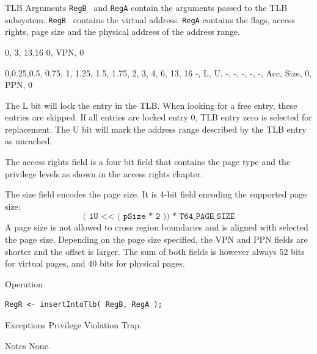 \begin{iPageDescEntry}{TLB Arguments}
	\texttt{RegB}  and \texttt{RegA} contain the arguments passed to the TLB subsystem. \texttt{RegB}  contains the virtual address. \texttt{RegA} contains the flags, access rights, page size and the physical address of the address range. 
	
	\begin{flushleft}
	\drawInstrFormatSixtyFour
        {0, 3, 13,16}
        {0, VPN, 0}
    \end{flushleft}
    \begin{flushleft}
	\drawInstrFormatSixtyFour
        {0,0.25,0.5, 0.75, 1, 1.25, 1.5, 1.75, 2, 3, 4, 6, 13, 16}
        {-, L, U, -, -, -, -, -, Acc, Size, 0, PPN, 0}
    \end{flushleft}
    
    The L bit will lock the entry in the TLB. When looking for a free entry, these entries are skipped. If all entries are locked entry 0, TLB entry zero is selected for replacement. The U bit will mark the address range described by the TLB entry as uncached.
    
    The access rights field is a four bit field that contains the page type and the privilege levels as shown in the access rights chapter. 
    
     The size field encodes the page size. It is 4-bit field encoding the supported page size: 
     	\[ \texttt{( 1U << ( pSize * 2 )) * T64\_PAGE\_SIZE} \] 
    A page size is not allowed to cross region boundaries and is aligned with selected the page size.
    Depending on the page size specified, the VPN and PPN fields are shorter and the offset is larger. The sum of both fields is however always 52 bits for virtual pages, and 40 bits for physical pages.
\end{iPageDescEntry}

\begin{iPageDescOpEntry}{Operation}
\begin{lstlisting}[style=iPageOpStyle]
RegR <- insertIntoTlb( RegB, RegA );
\end{lstlisting}
\end{iPageDescOpEntry}

\begin{iPageDescEntry}{Exceptions}
    Privilege Violation Trap.
\end{iPageDescEntry}

\begin{iPageDescEntry}{Notes}
    None.  
\end{iPageDescEntry}
